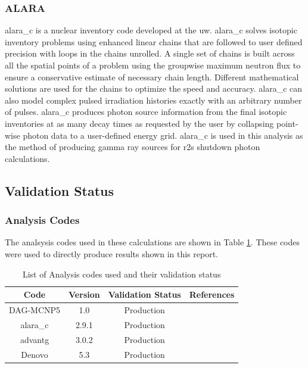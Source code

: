 \documentclass[12pt]{article}
\begin{document}
\subsubsection{ALARA}
\gls{alara_c} \cite{alara} is a nuclear inventory code developed at the \gls{uw}. 
\gls{alara_c} solves isotopic inventory problems using enhanced linear chains 
that are followed to user defined precision with loops in the chains unrolled.
A single set of chains is built across all the spatial points of a problem
using the groupwise maximum neutron flux to ensure a conservative estimate of
necessary chain length.  Different mathematical solutions are used for the
chains to optimize the speed and accuracy.  \gls{alara_c} can also model
complex pulsed irradiation histories exactly with an arbitrary number of
pulses. \gls{alara_c} produces photon source information from the final
isotopic inventories at as many decay times as requested by the user by
collapsing point-wise photon data to a user-defined energy
grid.  \gls{alara_c} is used in this analysis as the method of producing gamma
ray sources for \gls{r2s} shutdown photon calculations.

\subsection{Validation Status}
\subsubsection*{Analysis Codes}
The analsysis codes used in these calculations are shown in Table 
\ref{table:validation}. These codes were used to directly produce results shown
in this report.
\begin{centering}
 \begin{table}[ht!]
  \begin{tabular}{c | c | c | c}
  \hline
  Code & Version & Validation Status & References \\
  \hline 
  DAG-MCNP5 & 1.0 & Production & \cite{dagmc_validation}\\
  \gls{alara_c} & 2.9.1 & Production & \cite{alara}\\
  \gls{advantg} & 3.0.2 & Production & \cite{advantg}\\
  Denovo & 5.3 & Production & \cite{denovo} \\
  \end{tabular}
 \caption{List of Analysis codes used and their validation status}
 \label{table:validation}
 \end{table}
\end{centering}
\end{document}
